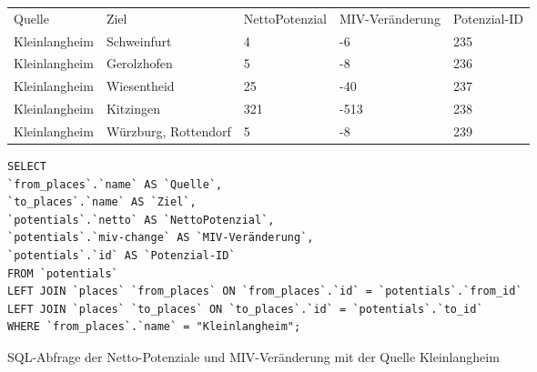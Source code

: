 \begin{tabular}{ l  l  l  l  l }
Quelle & Ziel & NettoPotenzial & MIV-Veränderung & Potenzial-ID\\ 
Kleinlangheim & Schweinfurt & 4 & -6 & 235\\ 
Kleinlangheim & Gerolzhofen & 5 & -8 & 236\\ 
Kleinlangheim & Wiesentheid & 25 & -40 & 237\\ 
Kleinlangheim & Kitzingen & 321 & -513 & 238\\ 
Kleinlangheim & Würzburg, Rottendorf & 5 & -8 & 239\\ 
\end{tabular}    
\newline
\newline
\begin{listing}[htbp]
\begin{verbatim}
SELECT
`from_places`.`name` AS `Quelle`, 
`to_places`.`name` AS `Ziel`, 
`potentials`.`netto` AS `NettoPotenzial`, 
`potentials`.`miv-change` AS `MIV-Veränderung`, 
`potentials`.`id` AS `Potenzial-ID`
FROM `potentials`
LEFT JOIN `places` `from_places` ON `from_places`.`id` = `potentials`.`from_id`
LEFT JOIN `places` `to_places` ON `to_places`.`id` = `potentials`.`to_id`
WHERE `from_places`.`name` = "Kleinlangheim";
\end{verbatim}
\caption{SQL-Abfrage der Netto-Potenziale und MIV-Veränderung mit der Quelle Kleinlangheim}\label{lst-fz-kleinlangheim}
\end{listing}